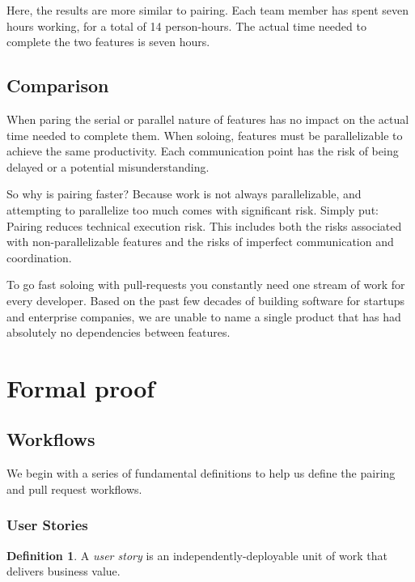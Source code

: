 \documentclass[letterpaper]{article}
\theoremstyle{definition}
\newtheorem{definition}[theorem]{Definition}
\begin{document}
    Here, the results are more similar to pairing.
    Each team member has spent seven hours working, for a total of 14 person-hours.
    The actual time needed to complete the two features is seven hours.

    \subsection{Comparison}\label{subsec:comparison}

    When paring the serial or parallel nature of features has no impact on the actual time needed to
    complete them.
    When soloing, features must be parallelizable to achieve the same productivity.
    Each communication point has the risk of being delayed or a potential misunderstanding.

    So why is pairing faster?
    Because work is not always parallelizable, and attempting to parallelize too much comes with significant risk.
    Simply put: Pairing reduces technical execution risk.
    This includes both the risks associated with non-parallelizable features and the risks of imperfect communication
    and coordination.

    To go fast soloing with pull-requests you constantly need one stream of work for every developer.
    Based on the past few decades of building software for startups and enterprise companies, we are unable to name a
    single product that has had absolutely no dependencies between features.


    \section{Formal proof}\label{sec:formal-proof}

    \subsection{Workflows}\label{subsec:workflows}

    We begin with a series of fundamental definitions to help us define the pairing and pull request workflows.

    \subsubsection{User Stories}\label{subsubsec:user-stories}

    \begin{definition}
        A \textit{user story} is an independently-deployable unit of work that delivers business value.
    \end{definition}
\end{document}
